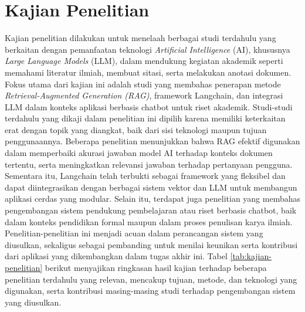 \section{Kajian Penelitian}

Kajian penelitian dilakukan untuk menelaah berbagai studi terdahulu yang berkaitan dengan pemanfaatan teknologi \emph{Artificial Intelligence} (AI), khususnya \emph{Large Language Models} (LLM), dalam mendukung kegiatan akademik seperti memahami literatur ilmiah, membuat sitasi, serta melakukan anotasi dokumen. Fokus utama dari kajian ini adalah studi yang membahas penerapan metode \textit{Retrieval-Augmented Generation (RAG)}, framework Langchain, dan integrasi LLM dalam konteks aplikasi berbasis chatbot untuk riset akademik.
\singlespacing{}
Studi-studi terdahulu yang dikaji dalam penelitian ini dipilih karena memiliki keterkaitan erat dengan topik yang diangkat, baik dari sisi teknologi maupun tujuan penggunaannya. Beberapa penelitian menunjukkan bahwa RAG efektif digunakan dalam memperbaiki akurasi jawaban model AI terhadap konteks dokumen tertentu, serta meningkatkan relevansi jawaban terhadap pertanyaan pengguna. Sementara itu, Langchain telah terbukti sebagai framework yang fleksibel dan dapat diintegrasikan dengan berbagai sistem vektor dan LLM untuk membangun aplikasi cerdas yang modular.
\singlespacing{}
Selain itu, terdapat juga penelitian yang membahas pengembangan sistem pendukung pembelajaran atau riset berbasis chatbot, baik dalam konteks pendidikan formal maupun dalam proses penulisan karya ilmiah. Penelitian-penelitian ini menjadi acuan dalam perancangan sistem yang diusulkan, sekaligus sebagai pembanding untuk menilai keunikan serta kontribusi dari aplikasi yang dikembangkan dalam tugas akhir ini.
\singlespacing{}
Tabel \ref{tab:kajian-penelitian} berikut menyajikan ringkasan hasil kajian terhadap beberapa penelitian terdahulu yang relevan, mencakup tujuan, metode, dan teknologi yang digunakan, serta kontribusi masing-masing studi terhadap pengembangan sistem yang diusulkan.

\vspace{-10pt}

